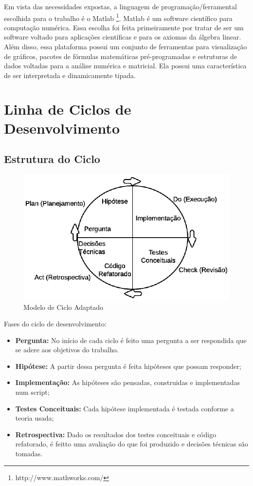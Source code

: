Em vista das necessidades expostas, a linguagem de programação/ferramental escolhida para o trabalho é o Matlab \footnote{http://www.mathworks.com/}. Matlab é um software científico para computação numérica. Essa escolha foi feita primeiramente por tratar de ser um software voltado para aplicações científicas e para os axiomas da álgebra linear. Além disso, essa plataforma possui um conjunto de ferramentas para visualização de gráficos, pacotes de fórmulas matemáticas pré-programadas e estruturas de dados voltadas para a análise numérica e matricial. Ela possui uma característica de ser interpretada e dinamicamente tipada.

\section {Linha de Ciclos de Desenvolvimento}
    
\subsection{Estrutura do Ciclo}

\begin{figure}[h] 
  \centering
    \includegraphics[keepaspectratio=true, scale=1.5]{figuras/ciclo_desenvolvimento}
    \caption{Modelo de Ciclo Adaptado}
\end{figure}

Fases do ciclo de desenvolvimento:
\begin{itemize}
\item \textbf{Pergunta:} No início de cada ciclo é feito uma pergunta a ser respondida que se adere aos objetivos do trabalho.
\item \textbf{Hipótese:} A partir dessa pergunta é feita hipóteses que possam responder;
\item \textbf{Implementação:} As hipóteses são pensadas, construidas e implementadas num script;
\item \textbf{Testes Conceituais:} Cada hipótese implementada é testada conforme a teoria usada;
\item \textbf{Retrospectiva:} Dado os resultados dos testes conceituais e código refatorado, é feitto uma avaliação do que foi produzido e decisões técnicas são tomadas.
\end{itemize}
  
